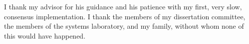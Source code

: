 I thank my advisor for his guidance and his patience with my first, very slow, consensus
implementation. I thank the members of my dissertation committee, the members of the systems
laboratory, and my family, without whom none of this would have happened.
